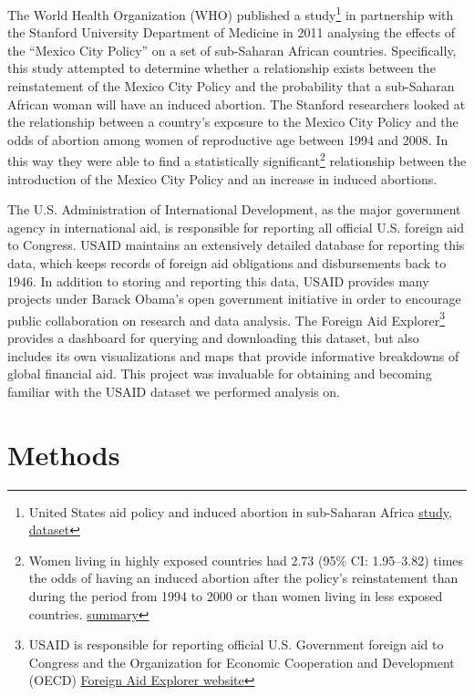 \documentclass[11pt,]{article}
\begin{document}
The World Health Organization (WHO) published a study\footnote{United
  States aid policy and induced abortion in sub-Saharan Africa
  \href{http://www.who.int/bulletin/volumes/89/12/11-091660/en/}{study},
  \href{http://www.who.int/bulletin/volumes/89/12/BLT-11-091660-table-T1.html}{dataset}}
in partnership with the Stanford University Department of Medicine in
2011 analysing the effects of the ``Mexico City Policy'' on a set of
sub-Saharan African countries. Specifically, this study attempted to
determine whether a relationship exists between the reinstatement of the
Mexico City Policy and the probability that a sub-Saharan African woman
will have an induced abortion. The Stanford researchers looked at the
relationship between a country's exposure to the Mexico City Policy and
the odds of abortion among women of reproductive age between 1994 and
2008. In this way they were able to find a statistically
significant\footnote{Women living in highly exposed countries had 2.73
  (95\% CI: 1.95--3.82) times the odds of having an induced abortion
  after the policy's reinstatement than during the period from 1994 to
  2000 or than women living in less exposed countries.
  \href{http://www.who.int/bulletin/volumes/89/12/BLT-11-091660-table-T3.html}{summary}}
relationship between the introduction of the Mexico City Policy and an
increase in induced abortions.

The U.S. Administration of International Development, as the major
government agency in international aid, is responsible for reporting all
official U.S. foreign aid to Congress. USAID maintains an extensively
detailed database for reporting this data, which keeps records of
foreign aid obligations and disbursements back to 1946. In addition to
storing and reporting this data, USAID provides many projects under
Barack Obama's open government initiative in order to encourage public
collaboration on research and data analysis. The Foreign Aid
Explorer\footnote{USAID is responsible for reporting official U.S.
  Government foreign aid to Congress and the Organization for Economic
  Cooperation and Development (OECD)
  \href{https://explorer.usaid.gov/aid-dashboard.html}{Foreign Aid
  Explorer website}} provides a dashboard for querying and downloading
this dataset, but also includes its own visualizations and maps that
provide informative breakdowns of global financial aid. This project was
invaluable for obtaining and becoming familiar with the USAID dataset we
performed analysis on.

\section{Methods}\label{methods}
\end{document}
